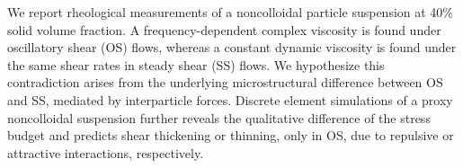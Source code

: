 %
\begin{paper}

\makepapertitle

%
\begin{paperabstract}
	We report rheological measurements of a noncolloidal particle suspension at 40\% solid volume fraction. A frequency-dependent complex viscosity is found under oscillatory shear (OS) flows, whereas a constant dynamic viscosity is found under the same shear rates in steady shear (SS) flows. We hypothesize this contradiction arises from the underlying microstructural difference between OS and SS, mediated by interparticle forces. Discrete element simulations of a proxy noncolloidal suspension further reveals the qualitative difference of the stress budget and predicts shear thickening or thinning, only in OS, due to repulsive or attractive interactions, respectively.
\end{paperabstract}


%



%


%


\end{paper}

